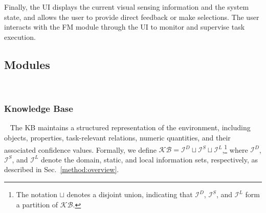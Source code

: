 
Finally, the UI displays the current visual sensing information and the system state, and allows the user to provide direct feedback or make selections. The user interacts with the FM module through the UI to monitor and supervise task execution.




\subsection{Modules}~\label{method:modules}
\subsubsection{Knowledge Base}~\label{method:KB}
The KB maintains a structured representation of the environment, including objects, properties, task-relevant relations, numeric quantities, and their associated confidence values. Formally, we define $\mathcal{KB} = \mathcal{I}^{D} \sqcup \mathcal{I}^{S} \sqcup \mathcal{I}^{L}$,\footnote{The notation $\sqcup$ denotes a disjoint union, indicating that $\mathcal{I}^{D}$, $\mathcal{I}^{S}$, and $\mathcal{I}^{L}$ form a partition of $\mathcal{KB}$.} where $\mathcal{I}^{D}$, $\mathcal{I}^{S}$, and $\mathcal{I}^{L}$ denote the domain, static, and local information sets, respectively, as described in Sec.~\ref{method:overview}.

